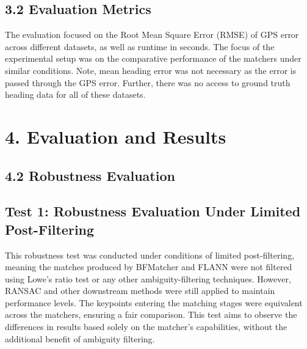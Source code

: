 \subsection*{3.2 Evaluation Metrics}

The evaluation focused on the Root Mean Square Error (RMSE) of GPS error across different datasets, as well as runtime in seconds. The focus of the experimental setup was on the comparative performance of the matchers under similar conditions. Note, mean heading error was not necessary as the error is passed through the GPS error. Further, there was no access to ground truth heading data for all of these datasets.

\section*{4. Evaluation and Results}










\subsection*{4.2 Robustness Evaluation}



\subsection*{Test 1: Robustness Evaluation Under Limited Post-Filtering}

This robustness test was conducted under conditions of limited post-filtering, meaning the matches produced by BFMatcher and FLANN were not filtered using Lowe's ratio test or any other ambiguity-filtering techniques. However, RANSAC and other downstream methods were still applied to maintain performance levels. The keypoints entering the matching stages were equivalent across the matchers, ensuring a fair comparison. This test aims to observe the differences in results based solely on the matcher's capabilities, without the additional benefit of ambiguity filtering.

